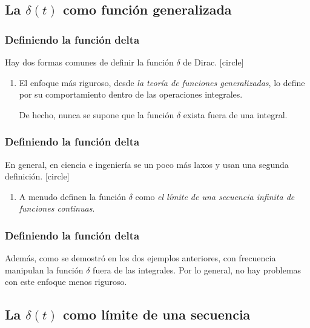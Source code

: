 \documentclass[12pt]{beamer}
\begin{document}
\subsection{La \texorpdfstring{$\delta(t)$}{d(t)} como función generalizada}

\begin{frame}
\frametitle{Definiendo la función delta}
Hay dos formas comunes de definir la función $\delta$ de Dirac. 
[circle]
\begin{enumerate}[<+->]
\item El enfoque más riguroso, desde \emph{la teoría de funciones generalizadas}, lo define por su comportamiento dentro de las operaciones integrales.
\par
De hecho, nunca se supone que la función $\delta$ exista fuera de una integral.
\seti 
\end{enumerate}
\end{frame}
\begin{frame}
\frametitle{Definiendo la función delta}
En general, en ciencia e ingeniería se un poco más laxos y usan una segunda definición.
[circle]
\begin{enumerate}[<+->]
\conti
\item A menudo definen la función $\delta$ como \emph{el límite de una secuencia infinita de funciones continuas}.
\end{enumerate}
\end{frame}
\begin{frame}
\frametitle{Definiendo la función delta}
Además, como se demostró en los dos ejemplos anteriores, con frecuencia manipulan la función $\delta$ fuera de las integrales.
\pause
Por lo general, no hay problemas con este enfoque menos riguroso.
\end{frame}

\subsection{La \texorpdfstring{$\delta(t)$}{d(t)} como límite de una secuencia}
\end{document}
